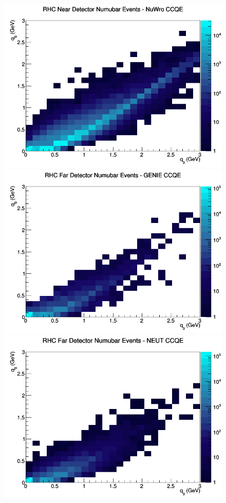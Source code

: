 \documentclass[12pt]{article}
\begin{document}
\begin{figure}[h]
\includegraphics[width=\linewidth]{eff_q0_q3/LAr/CCQE_RHC_ND_numubar_q3_q0_NuWro.png}
\endminipage
\newline
{}
\includegraphics[width=\linewidth]{eff_q0_q3/LAr/CCQE_RHC_FD_numubar_q3_q0_GENIE.png}
\endminipage
{}
\includegraphics[width=\linewidth]{eff_q0_q3/LAr/CCQE_RHC_FD_numubar_q3_q0_NEUT.png}

\end{figure}
\end{document}

